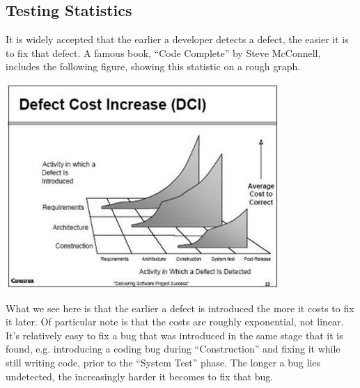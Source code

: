 \documentclass[12pt]{ucthesis}
\newenvironment{Figure}
  {\par\medskip\noindent\minipage{\linewidth}}
  {\endminipage\par\medskip}
\begin{document}
\subsection{Testing Statistics}
It is widely accepted that the earlier a developer detects a defect, the easier it is to fix that defect. A famous book, ``Code Complete'' by Steve McConnell\cite{DefectPic}, includes the following figure, showing this statistic on a rough graph.

\begin{Figure}
  \centering
	\includegraphics[width=0.75\linewidth]{defectcost.jpg} 
\end{Figure}

What we see here is that the earlier a defect is introduced the more it costs to fix it later. Of particular note is that the costs are roughly exponential, not linear. It's relatively easy to fix a bug that was introduced in the same stage that it is found, e.g. introducing a coding bug during ``Construction'' and fixing it while still writing code, prior to the ``System Test'' phase. The longer a bug lies undetected, the increasingly harder it becomes to fix that bug. 

\end{document}
